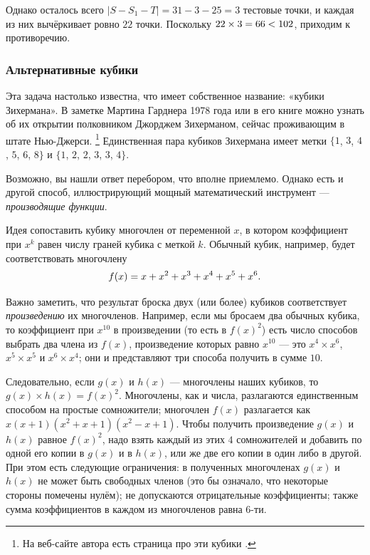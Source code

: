Однако осталось всего $|S - S_1 - T | = 31 - 3 - 25 = 3$ тестовые точки, и каждая из них вычёркивает ровно $22$ точки.
Поскольку $22 \times 3 = 66 \z< 102$, приходим к противоречию. 

\subsubsection*{Альтернативные кубики}

Эта задача настолько известна, что имеет собственное название: «кубики Зихермана».
В заметке Мартина Гарднера 1978 года \cite{25} или в его книге \cite{28} можно узнать об их открытии полковником Джорджем Зихерманом, сейчас проживающим в штате Нью-Джерси.%
\footnote{На веб-сайте автора есть страница про эти кубики \cite{sicherman}.}
Единственная пара кубиков Зихермана имеет метки $\{1$, $3$, $4$, $5$, $6$, $8\}$ и $\{1$, $2$, $2$, $3$, $3$, $4\}$.

Возможно, вы нашли ответ перебором, что вполне приемлемо.
Однако есть и другой способ, иллюстрирующий мощный математический инструмент --- \emph{производящие функции}.

Идея сопоставить кубику многочлен от переменной $x$, в котором коэффициент при $x^k$ равен числу граней кубика с меткой $k$.
Обычный кубик, например, будет соответствовать многочлену 
\[f(x) \z= x \z+ x^2 \z+ x^3 \z+ x^4 \z+ x^5 \z+ x^6.\]

Важно заметить, что результат броска двух (или более) кубиков соответствует \emph{произведению} их многочленов.
Например, если мы бросаем два обычных кубика, то коэффициент при $x^{10}$ в произведении (то есть в $f(x)^2$) есть число способов выбрать два члена из $f(x)$, произведение которых равно $x^{10}$ ---
это $x^4 \times x^6$, $x^5 \times x^5$ и $x^6 \times x^4$; они и представляют три способа получить в сумме $10$.

Следовательно, если $g(x)$ и $h(x)$ --- многочлены наших кубиков, то $g(x) \times h(x) = f(x)^2$.
Многочлены, как и числа, разлагаются единственным способом на простые сомножители;
многочлен $f(x)$ разлагается как $x(x + 1)(x^2 + x + 1)(x^2 - x + 1)$.
Чтобы получить произведение $g(x)$ и $h(x)$ равное $f(x)^2$, надо взять каждый из этих $4$ сомножителей и добавить по одной его копии в $g(x)$ и в $h(x)$, или же две его копии в один либо в другой.
При этом есть следующие ограничения:
в полученных многочленах $g(x)$ и $h(x)$ не может быть свободных членов (это бы означало, что некоторые стороны помечены нулём);
не допускаются отрицательные коэффициенты;
также сумма коэффициентов в каждом из многочленов равна 6-ти.


